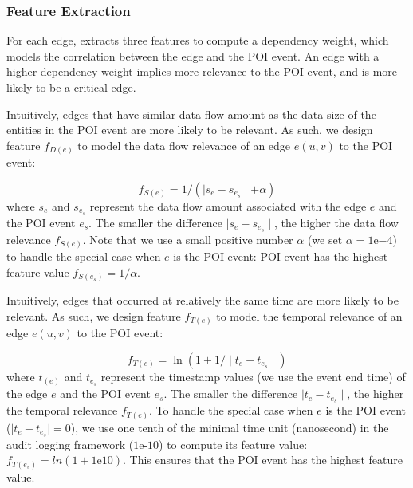 
\subsubsection{Feature Extraction}
\label{subsubsec:feature-extraction}
For each edge, \tool extracts three features to compute a dependency weight, which models the correlation between the edge and the POI event.
An edge with a higher dependency weight implies more relevance to the POI event, and is more likely to be a critical edge.
%

Intuitively, edges that have similar data flow amount as the data size of the entities in the POI event are more likely to be relevant.
As such, we design feature $f_{D(e)}$ to model the data flow relevance of an edge $e(u, v)$ to the POI event:

\begin{equation}
\label{eq:data-feature}
    f_{S(e)} = 1/(\mid s_{e} - s_{e_s}\mid + \alpha)
\end{equation}
where $s_{e}$ and $s_{e_s}$ represent the data 
flow amount associated with the edge $e$ and the POI event $e_s$.
The smaller the difference $\mid s_{e} - s_{e_s}\mid$, the higher the data flow relevance $f_{S(e)}$.
%
Note that we use a small positive number $\alpha$ (we set $\alpha = 1\mathrm{e}{-4}$) to handle the special case when $e$ is the POI event: POI event has the highest feature value $f_{S(e_s)} = 1/\alpha$.


Intuitively, edges that occurred at relatively the same time are more likely to be relevant.
As such, we design feature $f_{T(e)}$ to model the temporal relevance of an edge $e(u,v)$ to the POI event:

\begin{equation}
\label{eq:time-feature}
    f_{T(e)} = \ln(1 + 1/\mid t_{e} - t_{e_s}\mid)
\end{equation}
where $t_{(e)}$ and $t_{e_s}$ represent the timestamp values (we use the event end time) of the edge $e$ and the POI event $e_s$. 
The smaller the difference $\mid t_{e} - t_{e_s}\mid$, the higher the temporal relevance $f_{T(e)}$.
%
To handle the special case when $e$ is the POI event (\ie $\mid t_{e} - t_{e_s}\mid = 0$), we use one tenth of the minimal time unit (nanosecond) in the audit logging framework (\ie $1\mathrm{e}{\mbox{-}10}$) to compute its feature value: $f_{T(e_s)} = ln(1 + 1\mathrm{e}{10})$. 
This ensures that the POI event has the highest feature value.


